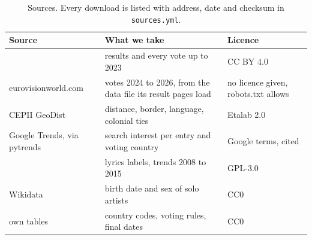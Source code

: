 \begin{table}[t]
\centering\small
\caption{Sources. Every download is listed with address, date and checksum in \texttt{sources.yml}.}
\label{tab:sources}
\begin{tabularx}{\linewidth}{@{}lXl@{}}
\toprule
Source & What we take & Licence \\
\midrule
\citet{spijkervet2023} & results and every vote up to 2023 & CC BY 4.0 \\
eurovisionworld.com & votes 2024 to 2026, from the data file its result pages load & no licence given, robots.txt allows \\
CEPII GeoDist \citep{mayer2011} & distance, border, language, colonial ties & Etalab 2.0 \\
Google Trends, via pytrends & search interest per entry and voting country & Google terms, cited \\
\citet{zviazdou2026} & lyrics labels, trends 2008 to 2015 & GPL-3.0 \\
Wikidata & birth date and sex of solo artists & CC0 \\
own tables & country codes, voting rules, final dates & CC0 \\
\bottomrule
\end{tabularx}
\end{table}
